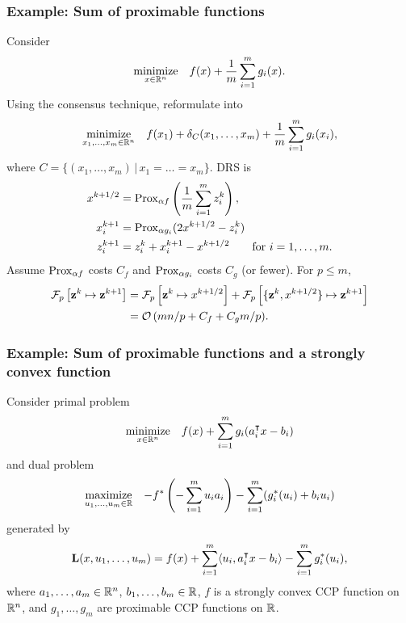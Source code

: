 \documentclass[10pt,mathserif]{beamer}
\begin{document}
\begin{frame}[plain]
\frametitle{Example: Sum of proximable functions}
Consider
\[
\begin{array}{ll}
\underset{x\in \mathbb{R}^n}{\mbox{minimize}} & \displaystyle{f(x)+\frac{1}{m}\sum_{i=1}^{m}g_i(x)}.
\end{array}
\]
Using the consensus technique, reformulate  into
\[
\begin{array}{ll}
\underset{x_1,\dots,x_m\in\mathbb{R}^{n}}{\mbox{minimize}} &
\displaystyle{f(x_1)+\delta_C(x_1,\dots,x_m)+\frac{1}{m}\sum_{i=1}^{m}g_i(x_i),}
\end{array}
\]
where $C=\{(x_1,\dots,x_m)\,|\,x_1=\dots=x_m\}$.
 \pause
DRS is
\begin{align*}
x^{k+1/2} &= \mathrm{Prox}_{\alpha f}\left(\frac{1}{m}\sum_{i=1}^{m}  z^{k}_i\right),\\
x^{k+1}_i &=\mathrm{Prox}_{\alpha g_i}(2x^{k+1/2}-z^k_i)\\
z^{k+1}_i &= z^k_i +  x^{k+1}_i-x^{k+1/2}\qquad\text{for }i=1,\dots,m.
\end{align*}
\pause 
Assume $\mathrm{Prox}_{\alpha f}$ costs $C_f$ and $\mathrm{Prox}_{\alpha g_i}$ costs $C_g$ (or fewer).
For $p\le m$,
\begin{align*}
\mathcal{F}_p\left[{\mathbf{z}}^k\mapsto {\mathbf{z}}^{k+1}\right]&=
\mathcal{F}_p\left[{\mathbf{z}}^k\mapsto x^{k+1/2}\right]+
\mathcal{F}_p\left[\{{\mathbf{z}}^k, x^{k+1/2}\}\mapsto {\mathbf{z}}^{k+1}\right]\\
&={\mathcal{O}\left(mn/p+C_f+ C_gm/p\right)}.
\end{align*}
\end{frame}


\begin{frame}
\frametitle{Example: Sum of proximable functions and a strongly convex function}
Consider primal problem
\[
\begin{array}{ll}
\underset{x\in \mathbb{R}^{n}}{\mbox{minimize}}&
\displaystyle{f(x) + \sum_{i=1}^{m}g_i(a_i^\intercal x-b_i)}
\end{array}
\]
and dual problem
\[
\begin{array}{ll}
\underset{u_1,\ldots,u_m\in\mathbb{R}}{\mbox{maximize}}&
\displaystyle{-f^*\left(-\sum_{i=1}^{m}u_ia_i\right) - \sum_{i=1}^{m}( g^*_i(u_i)+b_iu_i)}
\end{array}
\]
generated by
\begin{align*}
  \mathbf{L}(x,u_1,\dots,u_m) = f(x) + \sum_{i=1}^{m}  \langle u_i, a_i^\intercal x-b_i\rangle - \sum_{i=1}^{m} g^*_i(u_i),
\end{align*}
where $a_1,\dots,a_m\in\mathbb{R}^n$, $b_1,\dots,b_m\in \mathbb{R}$, $f$ is a strongly convex CCP function on $\mathbb{R}^n$, and $g_1,\dots,g_m$ are proximable CCP functions on $\mathbb{R}$.
\end{frame}
\end{document}
